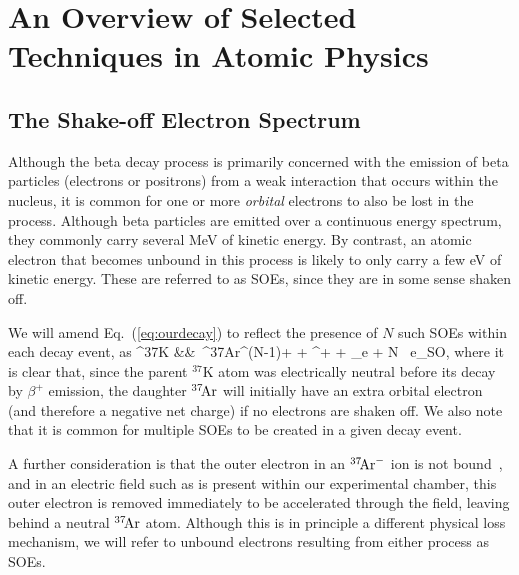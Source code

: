 %
%
%
\clearpage
\chapter{An Overview of Selected Techniques in Atomic Physics}
\label{atomicphysics_chapter}


\section{The Shake-off Electron Spectrum}
\label{section:soe_intro}
Although the beta decay process is primarily concerned with the emission of beta particles (electrons or positrons) from a weak interaction that occurs within the nucleus, it is common for one or more \emph{orbital} electrons to also be lost in the process.  Although beta particles are emitted over a continuous energy spectrum, they commonly carry several MeV of kinetic energy.  By contrast, an atomic electron that becomes unbound in this process is likely to only carry a few eV of kinetic energy.  These are referred to as \acp{SOE}, since they are in some sense shaken off.

We will amend Eq.~(\ref{eq:ourdecay}) to reflect the presence of $N$ such \ac{SOE}s within each decay event, as
\bea
^{37}\textrm{K} &\rightarrow& \,^{37}\textrm{\!Ar}^{(N-1)+} + \beta^{+} + \nu_e + N \, e_{\textrm{SO}}, 
\label{eq:ourdecay_withsoe}
\eea
where it is clear that, since the parent $^{37}\textrm{K}$ atom was electrically neutral before its decay by $\beta^+$ emission, the daughter $^{37}\textrm{\!Ar}$ will initially have an extra
orbital electron (and therefore a negative net charge) if no electrons are shaken off.  We also note that it is common for multiple SOEs to be created in a given decay event.  

A further consideration is that the outer electron in an $^{37}\textrm{\!Ar}^{-}$ ion is not bound~\cite{ArgonMinusIons}, and in an electric field such as is present within our experimental chamber, this outer electron is removed immediately to be accelerated through the field, leaving behind a neutral $^{37}\textrm{\!Ar}$ atom.  Although this is in principle a different physical loss mechanism, we will refer to unbound electrons resulting from either process as SOEs.  


